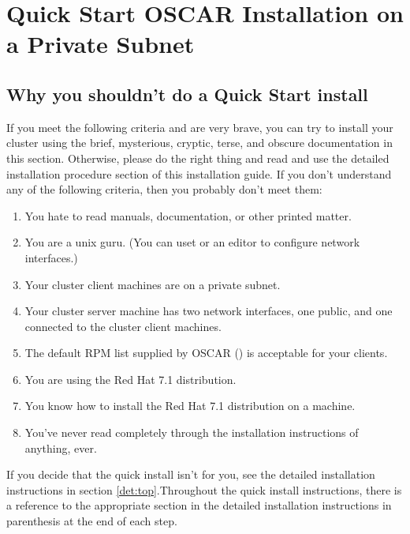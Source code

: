 %
%
%

\begchange
\section{Quick Start OSCAR Installation on a Private Subnet}


\subsection{Why you shouldn't do a Quick Start install}

If you meet the following criteria and are very brave, you can 
try to install your cluster using the brief, mysterious,
cryptic, terse, and obscure documentation in this section.  
Otherwise, please do the right thing and read and use the 
detailed installation procedure section of this installation guide.
If you don't understand any of the following criteria, 
then you probably don't meet them:

\begin{enumerate}
\item You hate to read manuals, documentation, or other printed matter.
\item You are a unix guru. (You can uset  or an editor to
  configure network interfaces.)
\item Your cluster client machines are on a private subnet.
\item Your cluster server machine has two network interfaces, one public,
  and one connected to the cluster client machines.
\item The default RPM list supplied by OSCAR
  () is
  acceptable for your clients.
\item You are using the Red Hat 7.1 distribution.
\item You know how to install the Red Hat 7.1 distribution on a machine.
\item You've never read completely through the installation instructions
  of anything, ever. 
\end{enumerate}

If you decide that the quick install isn't for you, see the detailed installation
instructions in section \ref{det:top}.Throughout the quick install instructions,
there is a reference to the appropriate section in the detailed installation 
instructions in parenthesis at the end of each step.

